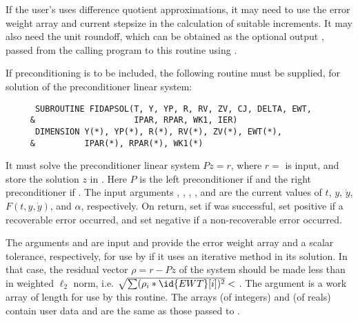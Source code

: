 \begin{Steps}
  If the user's  uses difference quotient approximations, it
  may need to use the error weight array  and current stepsize 
  in the calculation of suitable increments.  It may also need the unit
  roundoff, which can be obtained as the optional output ,
  passed from the calling program to this routine using .

  If preconditioning is to be included, the following routine must be
  supplied, for solution of the preconditioner linear system:
\begin{verbatim}
      SUBROUTINE FIDAPSOL(T, Y, YP, R, RV, ZV, CJ, DELTA, EWT, 
     &                    IPAR, RPAR, WK1, IER)
      DIMENSION Y(*), YP(*), R(*), RV(*), ZV(*), EWT(*), 
     &          IPAR(*), RPAR(*), WK1(*)
\end{verbatim}
  It must solve the preconditioner linear system $Pz = r$, where $r =$  
  is input, and store the solution $z$ in . Here $P$ is the left 
  preconditioner if  and the right preconditioner if .
  The input arguments , , , , and  are the
  current values of $t$, $y$, $\dot{y}$, $F(t,y,\dot{y})$, and $\alpha$, respectively.
  On return, set  if  was successful, set 
  positive if a recoverable error occurred, and set  negative if a 
  non-recoverable error occurred.

  The arguments  and  are input and provide the error weight
  array and a scalar tolerance, respectively, for use by  if it uses
  an iterative method in its solution.  In that case, the residual vector
  $\rho = r - Pz$ of the system should be made less than  in weighted
  $\ell_2$ norm, i.e. $\sqrt{\sum(\rho_i * \id{EWT}[i])^2} < $ .
  The argument  is a work array of length  for use by this
  routine.
  The arrays  (of integers) and  (of reals) contain user data
  and are the same as those passed to .


\end{Steps}
